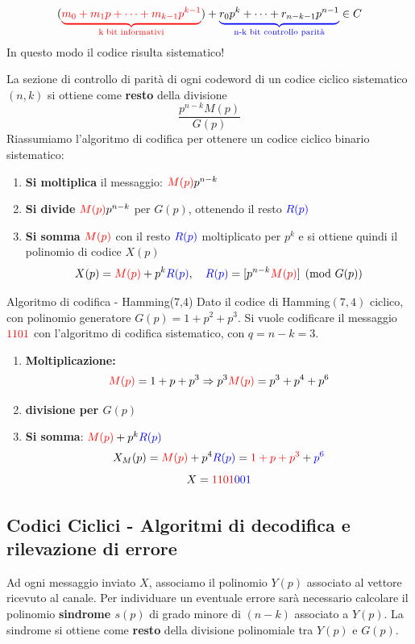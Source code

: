 \[
(\textcolor{red}{\underbrace{m_0 + m_1 p + \dots + m_{k-1} p^{k-1}}_{\text{k bit informativi}}}) 
+ \color{blue} \underbrace{\color{black} r_0 p^k + \dots + r_{n-k-1} p^{n-1} }_{\text{n-k bit controllo parità}} \color{black} \in C
\]
In questo modo il codice risulta sistematico!

La sezione di controllo di parità di ogni codeword di un codice ciclico sistematico $(n,k)$ si ottiene come \textbf{resto} della divisione
$$\frac{p^{n-k}M(p)}{G(p)}$$
Riassumiamo l'algoritmo di codifica per ottenere un codice ciclico binario sistematico:
\begin{enumerate}
    \item \textbf{Si moltiplica} il messaggio: $\textcolor{red}{M(p)}p^{n-k}$
    \item \textbf{Si divide} $\textcolor{red}{M(p)}p^{n-k}$ per $G(p)$, ottenendo il resto $\textcolor{blue}{R(p)}$
    \item \textbf{Si somma} $\textcolor{red}{M(p)}$ con il resto $\textcolor{blue}{R(p)}$ moltiplicato per $p^k$ e si ottiene quindi il polinomio di codice $X(p)$
    \[ X(p)= \textcolor{red}{M(p)} + p^k\textcolor{blue}{R(p)},\quad \textcolor{blue}{R(p)}= [ p^{n-k}\textcolor{red}{M(p)} ] \pmod{G(p)} \]
    
\end{enumerate}

\begin{esempio}{Algoritmo di codifica - Hamming(7,4)}
   Dato il codice di Hamming$(7,4)$ ciclico, con polinomio generatore $G(p)= 1+ p^2 +p^3$. Si vuole codificare il messaggio $\textcolor{red}{1101}$ con l'algoritmo di codifica sistematico, con $q=n-k=3$.
   \begin{enumerate}
       \item \textbf{Moltiplicazione:}
       $$ \textcolor{red}{M(p)}=1+p+p^3 \Rightarrow p^3\textcolor{red}{M(p)}=p^3+p^4+p^6$$
       \item \textbf{divisione per $G(p)$}
    

\item \textbf{Si somma}: $\textcolor{red}{M(p)} +p^k\textcolor{blue}{R(p)}$
       $$X_M(p)=\textcolor{red}{M(p)}+p^4\textcolor{blue}{R(p)} = \textcolor{red}{1+p+p^3} + \textcolor{blue}{p^6}$$
       $$X=\textcolor{red}{1101}\textcolor{blue}{001}$$
   \end{enumerate}

\end{esempio}

\subsection{Codici Ciclici - Algoritmi di decodifica e rilevazione di errore}
Ad ogni messaggio inviato $X$, associamo il polinomio $Y(p)$ associato al vettore ricevuto al canale. Per individuare un eventuale errore sarà necessario calcolare il polinomio \textbf{sindrome $s(p)$} di grado minore di $(n-k)$ associato a $Y(p)$. La sindrome si ottiene come \textbf{resto} della divisione polinomiale tra $Y(p)$ e $G(p)$.

